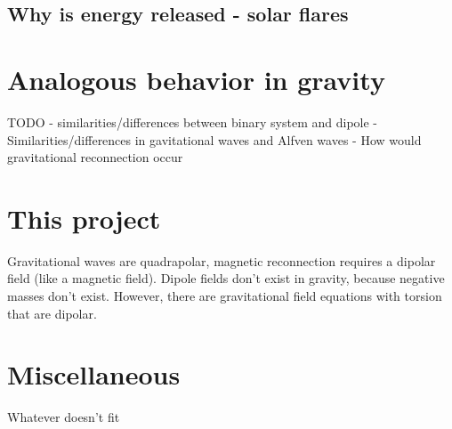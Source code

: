 \documentclass{article}
\begin{document}
\subsection{Why is energy released - solar flares}

\section{Analogous behavior in gravity}

TODO 
- similarities/differences between binary system and dipole
- Similarities/differences in gavitational waves and Alfven waves
- How would gravitational reconnection occur


\section{This project}\label{sec:This proj}

Gravitational waves are quadrapolar, magnetic reconnection requires a dipolar field (like a magnetic field). Dipole fields don't exist in gravity, because negative masses don't exist. However, there are gravitational field equations with torsion that are dipolar.

\section{Miscellaneous}\label{sec:Misc}

Whatever doesn't fit





\end{document}
